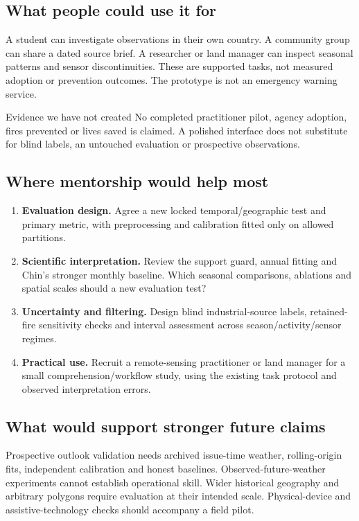 \subsection{What people could use it for}
A student can investigate observations in their own country. A community group can share a dated source brief. A researcher or land manager can inspect seasonal patterns and sensor discontinuities. These are supported tasks, not measured adoption or prevention outcomes. The prototype is not an emergency warning service.

\begin{keypoint}{Evidence we have not created}
No completed practitioner pilot, agency adoption, fires prevented or lives saved is claimed. A polished interface does not substitute for blind labels, an untouched evaluation or prospective observations.
\end{keypoint}

\subsection{Where mentorship would help most}
\begin{enumerate}
\item \textbf{Evaluation design.} Agree a new locked temporal/geographic test and primary metric, with preprocessing and calibration fitted only on allowed partitions.
\item \textbf{Scientific interpretation.} Review the support guard, annual fitting and Chin's stronger monthly baseline. Which seasonal comparisons, ablations and spatial scales should a new evaluation test?
\item \textbf{Uncertainty and filtering.} Design blind industrial-source labels, retained-fire sensitivity checks and interval assessment across season/activity/sensor regimes.
\item \textbf{Practical use.} Recruit a remote-sensing practitioner or land manager for a small comprehension/workflow study, using the existing task protocol and observed interpretation errors.
\end{enumerate}

\subsection{What would support stronger future claims}
Prospective outlook validation needs archived issue-time weather, rolling-origin fits, independent calibration and honest baselines. Observed-future-weather experiments cannot establish operational skill. Wider historical geography and arbitrary polygons require evaluation at their intended scale. Physical-device and assistive-technology checks should accompany a field pilot.

